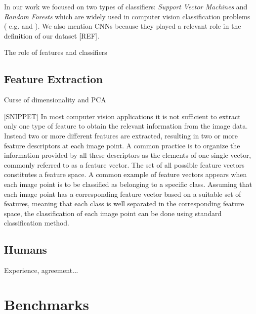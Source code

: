 In our work we focused on two types of classifiers: \textit{Support Vector Machines} and \textit{Random Forests}
which are widely used in computer vision classification problems ( e.g. \cite{mitosisDetectionLearningBased} and \cite{randForests04}).
We also mention \Glspl{CNN} because they played a relevant role in the definition of our dataset [REF].


 

The role of features and classifiers

\subsection{Feature Extraction}

Curse of dimensionality and PCA

[SNIPPET]
In most computer vision applications it is not sufficient to extract only one type of feature to obtain the relevant information from the image data.
Instead two or more different features are extracted, resulting in two or more feature descriptors at each image point.
A common practice is to organize the information provided by all these descriptors as the elements of one single vector,
commonly referred to as a feature vector. The set of all possible feature vectors constitutes a feature space.
A common example of feature vectors appears when each image point is to be classified as belonging to a specific class.
Assuming that each image point has a corresponding feature vector based on a suitable set of features,
meaning that each class is well separated in the corresponding feature space, the classification of each image point can be done using standard classification method.


\subsection{Humans}

Experience, agreement...

\vspace{0.5cm}



\section{Benchmarks}
\label{ch3:Bench}
